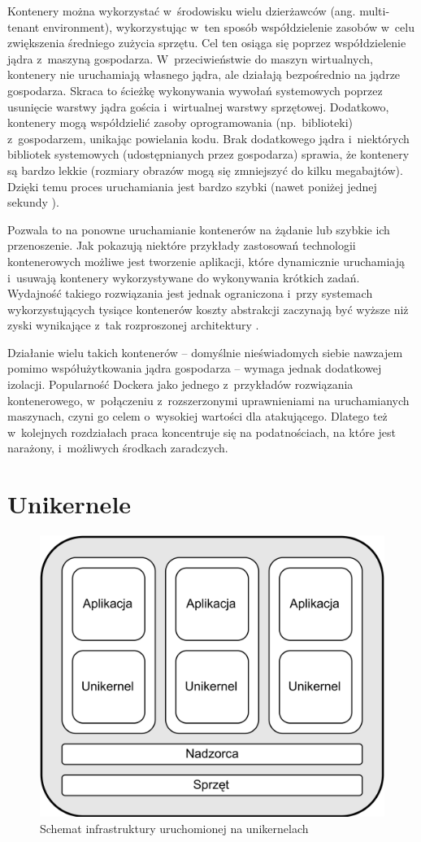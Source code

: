 Kontenery można wykorzystać w~środowisku wielu dzierżawców (ang. multi-tenant environment), wykorzystując w~ten sposób współdzielenie zasobów w~celu zwiększenia średniego zużycia sprzętu. Cel ten osiąga się poprzez współdzielenie jądra z~maszyną gospodarza. W~przeciwieństwie do maszyn wirtualnych, kontenery nie uruchamiają własnego jądra, ale działają bezpośrednio na jądrze gospodarza. Skraca to ścieżkę wykonywania wywołań systemowych poprzez usunięcie warstwy jądra gościa i~wirtualnej warstwy sprzętowej. Dodatkowo, kontenery mogą współdzielić zasoby oprogramowania (np.~biblioteki) z~gospodarzem, unikając powielania kodu. Brak dodatkowego jądra i~niektórych bibliotek systemowych (udostępnianych przez gospodarza) sprawia, że kontenery są bardzo lekkie (rozmiary obrazów mogą się zmniejszyć do kilku megabajtów). Dzięki temu proces uruchamiania jest bardzo szybki (nawet poniżej jednej sekundy \cite{ZhengIntegratingContainersIntoWorkflows}).

Pozwala to na ponowne uruchamianie kontenerów na żądanie lub szybkie ich przenoszenie. Jak pokazują niektóre przykłady zastosowań technologii kontenerowych możliwe jest tworzenie aplikacji, które dynamicznie uruchamiają i~usuwają kontenery wykorzystywane do wykonywania krótkich zadań. Wydajność takiego rozwiązania jest jednak ograniczona i~przy systemach wykorzystujących tysiące kontenerów koszty abstrakcji zaczynają być wyższe niż zyski wynikające z~tak rozproszonej architektury \cite{ZhengIntegratingContainersIntoWorkflows}.

Działanie wielu takich kontenerów -- domyślnie nieświadomych siebie nawzajem pomimo współużytkowania jądra gospodarza -- wymaga jednak dodatkowej izolacji. Popularność Dockera jako jednego z~przykładów rozwiązania kontenerowego, w~połączeniu z~rozszerzonymi uprawnieniami na uruchamianych maszynach, czyni go celem o~wysokiej wartości dla atakującego. Dlatego też w~kolejnych rozdziałach praca koncentruje się na podatnościach, na które jest narażony, i~możliwych środkach zaradczych.

\section{Unikernele}

\begin{figure}[ht]
    \centering
    \includegraphics[width=0.45\linewidth]{images/unikernel.png}
    \caption{Schemat infrastruktury uruchomionej na unikernelach}
    \label{fig:unikernel}
\end{figure}


